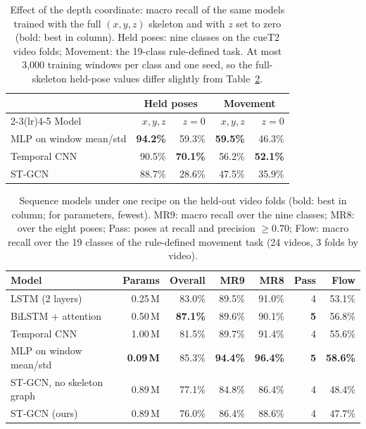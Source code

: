 \begin{table}[t]
\centering\footnotesize\setlength{\tabcolsep}{3pt}
\caption{Effect of the depth coordinate: macro recall of the same models trained with the full $(x,y,z)$ skeleton and with $z$ set to zero (bold: best in column). Held poses: nine classes on the cueT2 video folds; Movement: the 19-class rule-defined task. At most 3{,}000 training windows per class and one seed, so the full-skeleton held-pose values differ slightly from Table~\ref{tab:seq}.}\label{tab:z}
\begin{tabular}{@{}lrrrr@{}}
\toprule
 & \multicolumn{2}{c}{Held poses} & \multicolumn{2}{c}{Movement} \\ \cmidrule(lr){2-3}\cmidrule(lr){4-5}
Model & $x,y,z$ & $z{=}0$ & $x,y,z$ & $z{=}0$ \\ \midrule
MLP on window mean/std & \textbf{94.2\%} & 59.3\% & \textbf{59.5\%} & 46.3\% \\
Temporal CNN & 90.5\% & \textbf{70.1\%} & 56.2\% & \textbf{52.1\%} \\
ST-GCN & 88.7\% & 28.6\% & 47.5\% & 35.9\% \\ \bottomrule
\end{tabular}
\end{table}

\begin{table}[t]
\centering\footnotesize\setlength{\tabcolsep}{3pt}
\caption{Sequence models under one recipe on the held-out video folds (bold: best in column; for parameters, fewest). MR9: macro recall over the nine classes; MR8: over the eight poses; Pass: poses at recall and precision $\ge0.70$; Flow: macro recall over the 19 classes of the rule-defined movement task (24 videos, 3 folds by video).}\label{tab:seq}
\begin{tabular}{@{}lrrrrrr@{}}
\toprule
Model & Params & Overall & MR9 & MR8 & Pass & Flow \\ \midrule
LSTM (2 layers) & 0.25\,M & 83.0\% & 89.5\% & 91.0\% & 4 & 53.1\% \\
BiLSTM + attention & 0.50\,M & \textbf{87.1\%} & 89.6\% & 90.1\% & \textbf{5} & 56.8\% \\
Temporal CNN & 1.00\,M & 81.5\% & 89.7\% & 91.4\% & 4 & 55.6\% \\
MLP on window mean/std & \textbf{0.09\,M} & 85.3\% & \textbf{94.4\%} & \textbf{96.4\%} & \textbf{5} & \textbf{58.6\%} \\
ST-GCN, no skeleton graph & 0.89\,M & 77.1\% & 84.8\% & 86.4\% & 4 & 48.4\% \\
ST-GCN (ours) & 0.89\,M & 76.0\% & 86.4\% & 88.6\% & 4 & 47.7\% \\ \bottomrule
\end{tabular}
\end{table}


